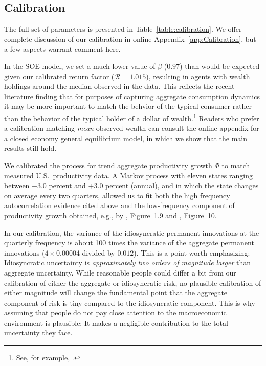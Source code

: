 \documentclass[titlepage]{./econtex}
\begin{document}
\subsection{Calibration}\label{sec:calibration}

The full set of parameters is presented in Table~\ref{table:calibration}.  We offer complete discussion of our calibration in online Appendix~\ref{app:Calibration}, but a few aspects warrant comment here.

In the SOE model, we set a much lower value of $\beta$ ($ %
0.97 %
 $) than would be expected given our calibrated return factor (${\mathscr{R}} = 1.015$), resulting in agents with wealth holdings around the median observed in the data.  This reflects the recent literature finding that for purposes of capturing aggregate consumption dynamics it may be more important to match the behvior of the typical consumer rather than the behavior of the typical holder of a dollar of wealth.\footnote{See, for example, \cite{opLiquidH2M}.}  Readers who prefer a calibration matching \textit{mean} observed wealth can consult the online appendix for a closed economy general equilibrium model, in which we show that the main results still hold.

We calibrated the process for trend aggregate productivity growth $\Phi$ to match measured U.S.\ productivity data.  A Markov process with eleven states ranging between $-3.0$ percent and $+3.0$ percent (annual), and in which the state changes on average every two quarters, allowed us to fit both the high frequency autocorrelation evidence cited above and the low-frequency component of productivity growth obtained, e.g., by \cite{sswNAIRU}, Figure~1.9 and \cite{fernald:disappointingRecovery}, Figure~10.

In our calibration, the variance of the idiosyncratic permanent innovations at the quarterly frequency is about 100 times the variance of the aggregate permanent innovations ($4 \times $0.00004 divided by $%
0.012 %
 $).  This is a point worth emphasizing: Idiosyncratic uncertainty is {\it approximately two orders of magnitude larger} than aggregate uncertainty.  While reasonable people could differ a bit from our calibration of either the aggregate or idiosyncratic risk, no plausible calibration of either magnitude will change the fundamental point that the aggregate component of risk is tiny compared to the idiosyncratic component.  This is why assuming that people do not pay close attention to the macroeconomic environment is plausible: It makes a negligible contribution to the total uncertainty they face.
\end{document}
